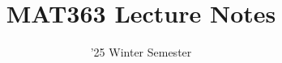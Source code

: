 \documentclass[11pt]{scrartcl}
\begin{document}
\title{MAT363 Lecture Notes}
\date{'25 Winter Semester} %
\maketitle

\setcounter{tocdepth}{1}
\tableofcontents
\newpage


\end{document}

